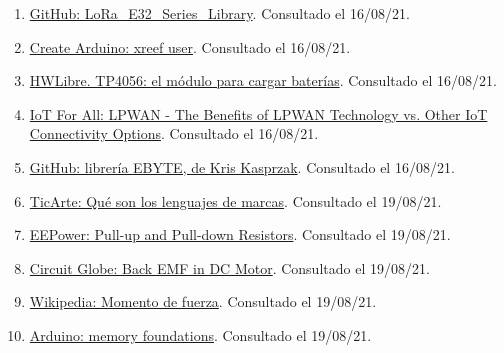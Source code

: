 \documentclass[12pt]{article}
\begin{document}
\begin{enumerate}
			\item 
			\label{bib: xreef library}
			\href{https://github.com/xreef/LoRa_E32_Series_Library}{GitHub: LoRa\_E32\_Series\_Library}. Consultado el 16/08/21.

			\item 
			\label{bib: xreef user}
			\href{https://create.arduino.cc/projecthub/xreef}{Create Arduino: xreef user}. Consultado el 16/08/21.	

			\item 
			\label{bib: hwlibre TP4056}
			\href{https://www.hwlibre.com/tp4056/}{HWLibre. TP4056: el módulo para cargar baterías}. Consultado el 16/08/21.

			\item 
			\label{bib: iotforall lpwan options}
			\href{https://www.iotforall.com/lpwan-benefits-vs-iot-connectivity-options}{IoT For All: LPWAN - The Benefits of LPWAN Technology vs. Other IoT Connectivity Options}. Consultado el 16/08/21.

			\item 
			\label{bib: github libreria EBYTE}
			\href{https://github.com/KrisKasprzak/EBYTE}{GitHub: librería EBYTE, de Kris Kasprzak}. Consultado el 16/08/21.

			\item 
			\label{bib: lenguaje marcado definicion}
			\href{https://www.ticarte.com/contenido/que-son-los-lenguajes-de-marcas}{TicArte: Qué son los lenguajes de marcas}. Consultado el 19/08/21.

			\item 
			\label{bib: eepower pull up pull down resistors}
			\href{https://eepower.com/resistor-guide/resistor-applications/pull-up-resistor-pull-down-resistor/#}{EEPower: Pull-up and Pull-down Resistors}. Consultado el 19/08/21.	

			\item 
			\label{bib: circuit globe back emf}
			\href{https://circuitglobe.com/what-is-back-emf-in-dc-motor.html}{Circuit Globe: Back EMF in DC Motor}. Consultado el 19/08/21.	

			\item 
			\label{bib: wikipedia momento de fuerza}
			\href{https://es.wikipedia.org/wiki/Momento_de_fuerza}{Wikipedia: Momento de fuerza}. Consultado el 19/08/21.	

			\item 
			\label{bib: arduino memory foundations}
			\href{https://www.arduino.cc/en/Tutorial/Foundations/Memory}{Arduino: memory foundations}. Consultado el 19/08/21.
			

\end{enumerate}
\end{document}
